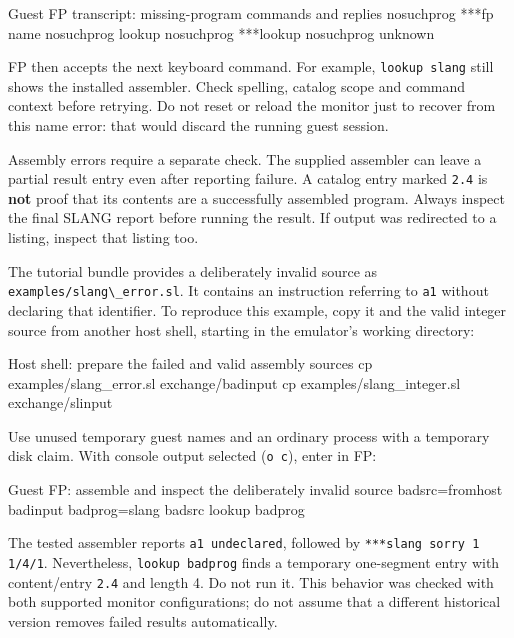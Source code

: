 \begin{commandexample}{Guest FP transcript: missing-program commands and replies}
nosuchprog
***fp name nosuchprog
lookup nosuchprog
***lookup nosuchprog unknown
\end{commandexample}

FP then accepts the next keyboard command. For example, \passthrough{\lstinline!lookup slang!} still shows the installed assembler. Check spelling, catalog scope and command context before retrying. Do not reset or reload the monitor just to recover from this name error: that would discard the running guest session.

Assembly errors require a separate check. The supplied assembler can leave a partial result entry even after reporting failure. A catalog entry marked \passthrough{\lstinline!2.4!} is \textbf{not} proof that its contents are a successfully assembled program. Always inspect the final SLANG report before running the result. If output was redirected to a listing, inspect that listing too.

The tutorial bundle provides a deliberately invalid source as \passthrough{\lstinline!examples/slang\_error.sl!}. It contains an instruction referring to \passthrough{\lstinline!a1!} without declaring that identifier. To reproduce this example, copy it and the valid integer source from another host shell, starting in the emulator's working directory:

\begin{commandexample}[language=sh]{Host shell: prepare the failed and valid assembly sources}
cp examples/slang_error.sl exchange/badinput
cp examples/slang_integer.sl exchange/slinput
\end{commandexample}

Use unused temporary guest names and an ordinary process with a temporary disk claim. With console output selected (\passthrough{\lstinline!o c!}), enter in FP:

\begin{commandexample}{Guest FP: assemble and inspect the deliberately invalid source}
badsrc=fromhost badinput
badprog=slang badsrc
lookup badprog
\end{commandexample}

The tested assembler reports \passthrough{\lstinline!a1 undeclared!}, followed by \passthrough{\lstinline!***slang sorry 1 1/4/1!}. Nevertheless, \passthrough{\lstinline!lookup badprog!} finds a temporary one-segment entry with content/entry \passthrough{\lstinline!2.4!} and length 4. Do not run it. This behavior was checked with both supported monitor configurations; do not assume that a different historical version removes failed results automatically.

